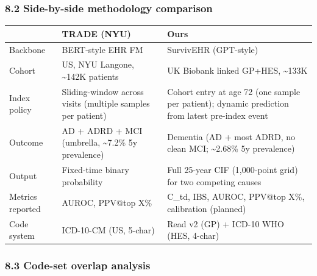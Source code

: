 \documentclass[
  11pt,
]{article}
\newcounter{none} %
\begin{document}
\subsubsection{8.2 Side-by-side methodology
comparison}\label{side-by-side-methodology-comparison}

{\def\LTcaptype{none} %
\begin{longtable}[]{|>{\raggedright\arraybackslash}p{}|>{\raggedright\arraybackslash}p{}|>{\raggedright\arraybackslash}p{}|}
\hline
\begin{minipage}[b]{\linewidth}\raggedright
\end{minipage} & \begin{minipage}[b]{\linewidth}\raggedright
TRADE (NYU)
\end{minipage} & \begin{minipage}[b]{\linewidth}\raggedright
Ours
\end{minipage} \\
\hline
\hline
\endhead
\hline
\endlastfoot
Backbone & BERT-style EHR FM & SurvivEHR (GPT-style) \\
\hline
Cohort & US, NYU Langone, \textasciitilde142K patients & UK Biobank
linked GP+HES, \textasciitilde133K \\
\hline
Index policy & Sliding-window across visits (multiple samples per
patient) & Cohort entry at age 72 (one sample per patient); dynamic
prediction from latest pre-index event \\
\hline
Outcome & AD + ADRD + MCI (umbrella, \textasciitilde7.2\% 5y prevalence)
& Dementia (AD + most ADRD, no clean MCI; \textasciitilde2.68\% 5y
prevalence) \\
\hline
Output & Fixed-time binary probability & Full 25-year CIF (1,000-point
grid) for two competing causes \\
\hline
Metrics reported & AUROC, PPV@top X\% & C\_td, IBS, AUROC, PPV@top X\%,
calibration (planned) \\
\hline
Code system & ICD-10-CM (US, 5-char) & Read v2 (GP) + ICD-10 WHO (HES,
4-char) \\
\hline
\end{longtable}
}

\subsubsection{8.3 Code-set overlap
analysis}\label{code-set-overlap-analysis}
\end{document}
